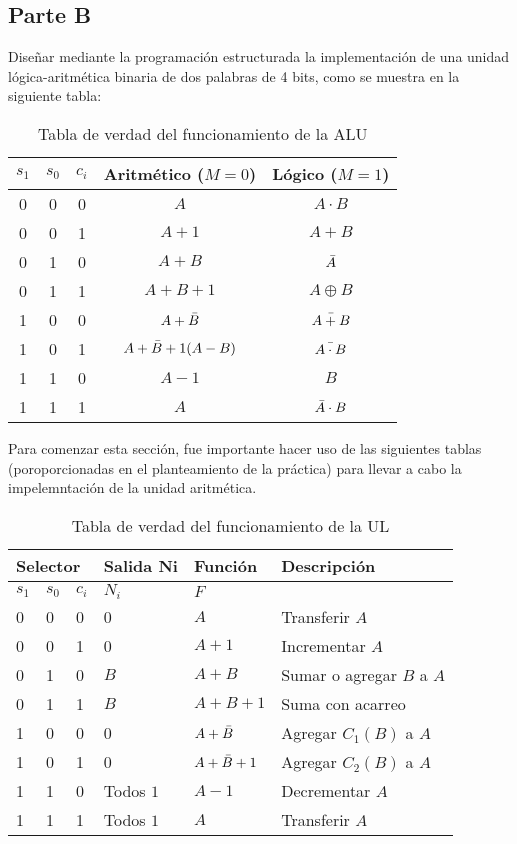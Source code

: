 \documentclass[../procedimientos.tex]{subfiles}
\begin{document}
\clearpage
\subsection{Parte B}
\begin{em}
  Diseñar mediante la programación estructurada la implementación de una unidad 
  lógica-aritmética binaria de dos palabras de 4 bits, como se muestra en la 
  siguiente tabla:
\end{em}
\begin{table}[H]
  \centering
  \begin{tabular}{ccc|c|c}
    $s_1$ & $s_0$ & $c_i$ & Aritmético ($M=0$) & Lógico ($M=1$)\\
    \hline
    0 & 0 & 0 & $A$ & $A \cdot B$\\
    0 & 0 & 1 & $A+1$ & $A + B$\\
    0 & 1 & 0 & $A+B$ & $\bar{A}$\\
    0 & 1 & 1 & $A+B+1$ & $A \oplus B$\\
    1 & 0 & 0 & $A+\bar{B}$ & $\bar{A + B}$\\
    1 & 0 & 1 & $A+\bar{B}+1(A-B)$ & $\bar{A \cdot B}$\\
    1 & 1 & 0 & $A-1$ & $B$\\
    1 & 1 & 1 & $A$ & $\bar{A} \cdot B$
  \end{tabular}
  \caption{Tabla de verdad del funcionamiento de la ALU}
\end{table}

Para comenzar esta sección, fue importante hacer uso de las siguientes tablas 
(poroporcionadas en el planteamiento de la práctica) para llevar a cabo la 
impelemntación de la unidad aritmética.
\begin{table}[H]
  \centering
  \begin{tabular}{p{1cm}p{1cm}p{1cm}|p{2cm}|p{2cm}|p{6cm}}
    \hline
    \multicolumn{3}{p{3cm}|}{\textbf{Selector}} & \textbf{Salida Ni} & 
    \textbf{Función} & \textbf{Descripción}\\
    \hline
    $s_1$ & $s_0$ & $c_i$ & $N_i$ & $F$\\
    \hline
    0 & 0 & 0 & 0 & $A$ & Transferir $A$\\
    0 & 0 & 1 & 0 & $A + 1$ & Incrementar $A$\\
    0 & 1 & 0 & $B$ & $A + B$ & Sumar o agregar $B$ a $A$\\
    0 & 1 & 1 & $B$ & $A + B + 1$ & Suma con acarreo\\
    1 & 0 & 0 & 0 & $A + \bar{B}$ & Agregar $C_1(B)$ a $A$\\
    1 & 0 & 1 & 0 & $A + \bar{B} + 1$ & Agregar $C_2(B)$ a $A$\\
    1 & 1 & 0 & Todos $1$ & $A - 1$ & Decrementar $A$\\
    1 & 1 & 1 & Todos $1$ & $A$ & Transferir $A$\\
  \end{tabular}
  \caption{Tabla de verdad del funcionamiento de la UL}
  \label{tab:ua_func}
\end{table}
\end{document}
